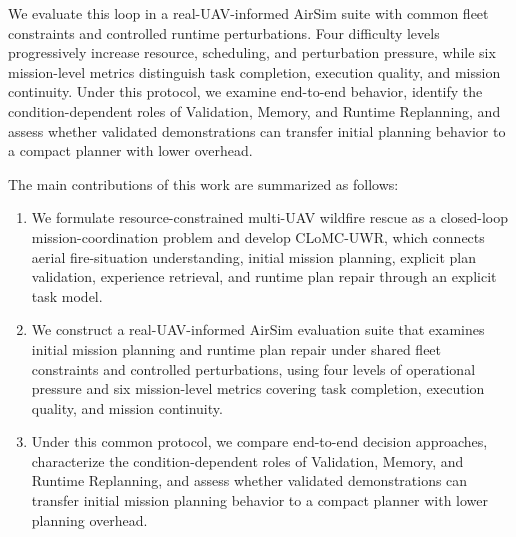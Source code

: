 We evaluate this loop in a real-UAV-informed AirSim suite with common fleet
constraints and controlled runtime perturbations. Four difficulty levels
progressively increase resource, scheduling, and perturbation pressure, while
six mission-level metrics distinguish task completion, execution quality, and
mission continuity. Under this protocol, we examine end-to-end behavior,
identify the condition-dependent roles of Validation, Memory, and Runtime
Replanning, and assess whether validated demonstrations can transfer initial
planning behavior to a compact planner with lower overhead.

The main contributions of this work are summarized as follows:
\begin{enumerate}[leftmargin=1.6em,itemsep=2pt,topsep=3pt]
    \item We formulate resource-constrained multi-UAV wildfire rescue as a
    closed-loop mission-coordination problem and develop CLoMC-UWR, which
    connects aerial fire-situation understanding, initial mission planning,
    explicit plan validation, experience retrieval, and runtime plan repair
    through an explicit task model.
    \item We construct a real-UAV-informed AirSim evaluation suite that examines
    initial mission planning and runtime plan repair under shared fleet constraints and
    controlled perturbations, using four levels of operational pressure and six
    mission-level metrics covering task completion, execution quality, and
    mission continuity.
    \item Under this common protocol, we compare end-to-end decision approaches,
    characterize the condition-dependent roles of Validation, Memory, and
    Runtime Replanning, and assess whether validated demonstrations can transfer
    initial mission planning behavior to a compact planner with lower planning overhead.
\end{enumerate}

\endinput
